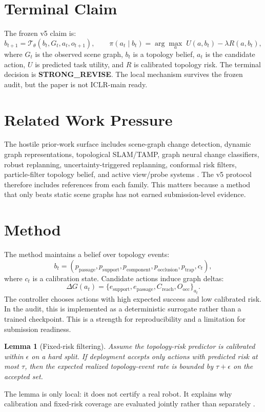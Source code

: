 \documentclass{article}
\newtheorem{lemma}{Lemma}
\begin{document}
\section{Terminal Claim}
The frozen v5 claim is:
\[
  b_{t+1} = \mathcal{T}_{\theta}(b_t, G_t, a_t, o_{t+1}), \qquad
  \pi(a_t \mid b_t) = \arg\max_a \; U(a,b_t) - \lambda R(a,b_t),
\]
where $G_t$ is the observed scene graph, $b_t$ is a topology belief, $a_t$ is the candidate action, $U$ is predicted task utility, and $R$ is calibrated topology risk. The terminal decision is \textbf{STRONG\_REVISE}. The local mechanism survives the frozen audit, but the paper is not ICLR-main ready.

\section{Related Work Pressure}
The hostile prior-work surface includes scene-graph change detection, dynamic graph representations, topological SLAM/TAMP, graph neural change classifiers, robust replanning, uncertainty-triggered replanning, conformal risk filters, particle-filter topology belief, and active view/probe systems \citep{muhammad2022visionbased7,shi2020change8,gu2019a9,xiong1998efficient10,chen2025crossviewpoint11,wu2021a12,liu2025from13,mittal2009scene14}. The v5 protocol therefore includes references from each family. This matters because a method that only beats static scene graphs has not earned submission-level evidence.

\section{Method}
The method maintains a belief over topology events:
\[
 b_t = (p_{\mathrm{passage}}, p_{\mathrm{support}}, p_{\mathrm{component}}, p_{\mathrm{occlusion}}, p_{\mathrm{trap}}, c_t),
\]
where $c_t$ is a calibration state. Candidate actions induce graph deltas:
\[
 \Delta G(a_t) = \{e_{\mathrm{support}}, e_{\mathrm{passage}}, C_{\mathrm{reach}}, O_{\mathrm{occ}}\}_{a_t}.
\]
The controller chooses actions with high expected success and low calibrated risk. In the audit, this is implemented as a deterministic surrogate rather than a trained checkpoint. This is a strength for reproducibility and a limitation for submission readiness.

\begin{lemma}[Fixed-risk filtering]
Assume the topology-risk predictor is calibrated within $\epsilon$ on a hard split. If deployment accepts only actions with predicted risk at most $\tau$, then the expected realized topology-event rate is bounded by $\tau+\epsilon$ on the accepted set.
\end{lemma}
\noindent The lemma is only local: it does not certify a real robot. It explains why calibration and fixed-risk coverage are evaluated jointly rather than separately \citep{cheong2000scenebased24,moon2019pddl25,chong2026robust26,sakurada2020weakly27,lin2025robust28,mujkic2023framework29,sharma2022early30,liu2025path31,li2008a32}.
\end{document}
